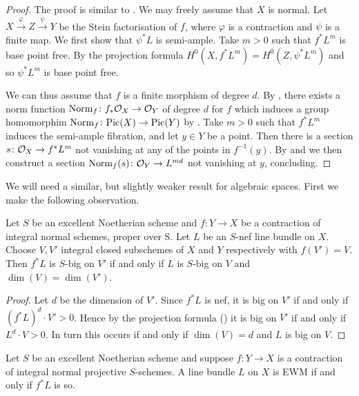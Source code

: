 	\begin{proof}
	The proof is similar to \cite[Lemma 2.10]{Keel}.	
	We may freely assume that $X$ is normal. 
	Let $X \xrightarrow{\varphi} Z \xrightarrow{\psi} Y$ be the Stein factorisation of $f$, where $\varphi$ is a contraction and $\psi$ is a finite map. 
	We first show that $\psi^*L$ is semi-ample. Take $m>0$ such that $f^*L^{ m}$ is base point free. By the projection formula $H^0(X, f^*L^{m})=H^0(Z, \psi^*L^{m})$ and so $\psi^*L^{m}$ is base point free.
	
	We can thus assume that $f$ is a finite morphism of degree $d$.
	By , there exists a norm function $\textup{Norm}_f \colon f_*\mathcal{O}_X \to \mathcal{O}_Y$ of degree $d$ for $f$ which induces a group homomorphim $\textup{Norm}_f \colon \text{Pic}(X) \to \text{Pic}(Y)$ by . Take $m>0$ such that $f^*L^{m}$ induces the semi-ample fibration, and let $y\in Y$ be a point. Then there is a section $s\colon \mathcal{O}_X\to f^*L^{m}$ not vanishing at any of the points in $f^{-1}(y)$. By  and  we then construct a section $\textup{Norm}_f(s)\colon \mathcal{O}_{Y}\to L^{md}$ not vanishing at $y$, concluding.
	
\end{proof}

	We will need a similar, but slightly weaker result for algebraic spaces. First we make the following observation.

	\begin{lemma}\label{com-big}
	Let $S$ be an excellent Noetherian scheme and $f \colon Y \to X$ be a contraction of integral normal schemes, proper over S. Let $L$ be an $S$-nef line bundle on $X$. Choose $V,V'$ integral closed subschemes of $X$ and $Y$ respectively with $f(V')=V$. Then $f^{*}L$ is $S$-big on $V'$ if and only if $L$ is $S$-big on $V$ and $\dim (V)=\dim (V')$.  
	\end{lemma}

	\begin{proof}
	
	Let $d$ be the dimension of $V'$. Since $f^{*}L$ is nef, it is big on $V'$ if and only if $(f^{*}L)^{d} \cdot V'>0$.
	Hence by the projection formula (\cite[Proposition VI.2.11]{k-rat-curves}) it is big on $V'$ if and only if $L^{d} \cdot V> 0$. In turn this occurs if and only if $\dim (V) =d$ and $L$ is big on $V$.
\end{proof}

\begin{lemma}\label{pp-EWM}
	Let $S$ be an excellent Noetherian scheme and suppose $f \colon Y\to X$ is a contraction of integral normal projective $S$-schemes.
	A line bundle $L$ on $X$ is EWM if and only if $f^{*}L$ is so.	
\end{lemma}

